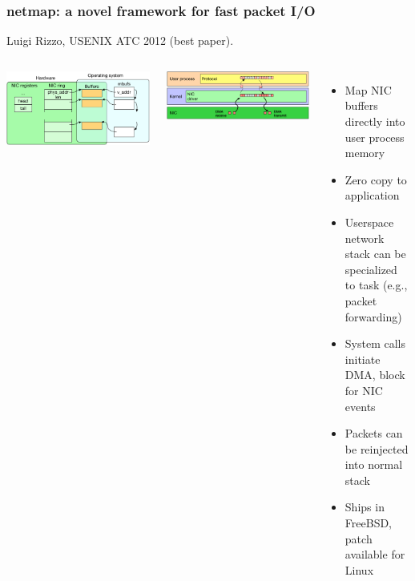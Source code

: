 \begin{frame}
  \frametitle{netmap: a novel framework for fast packet I/O}

  Luigi Rizzo, USENIX ATC 2012 (best paper).

  \begin{columns}[T]

      \smallskip
      \includegraphics[width=1.1\textwidth]{../../figures/network-nic-stack.pdf}

      \bigskip
      \includegraphics[width=1.1\textwidth]{../../figures/network-netmap-memory-flow.pdf}


    \begin{itemize}
      \item Map NIC buffers directly into user process memory
      \item Zero copy to application
      \item Userspace network stack can be specialized to task (e.g., packet
	forwarding)
      \item System calls initiate DMA, block for NIC events
      \item Packets can be reinjected into normal stack
      \item Ships in FreeBSD, patch available for Linux
    \end{itemize}
  \end{columns}
\end{frame}

